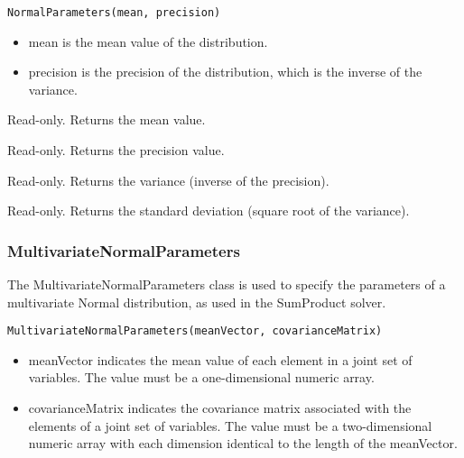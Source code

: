 
\begin{lstlisting}
NormalParameters(mean, precision)
\end{lstlisting}

\begin{itemize}
\item mean is the mean value of the distribution.
\item precision is the precision of the distribution, which is the inverse of the variance.
\end{itemize}




Read-only.  Returns the mean value.


Read-only.  Returns the precision value.


Read-only.  Returns the variance (inverse of the precision).


Read-only.  Returns the standard deviation (square root of the variance).




\subsubsection{MultivariateNormalParameters}
\label{sec:MultivariateNormalParameters}

The MultivariateNormalParameters class is used to specify the parameters of a multivariate Normal distribution, as used in the SumProduct solver.


\begin{lstlisting}
MultivariateNormalParameters(meanVector, covarianceMatrix)
\end{lstlisting}

\begin{itemize}
\item meanVector indicates the mean value of each element in a joint set of variables.  The value must be a one-dimensional numeric array.
\item covarianceMatrix indicates the covariance matrix associated with the elements of a joint set of variables.  The value must be a two-dimensional numeric array with each dimension identical to the length of the meanVector.
\end{itemize}


